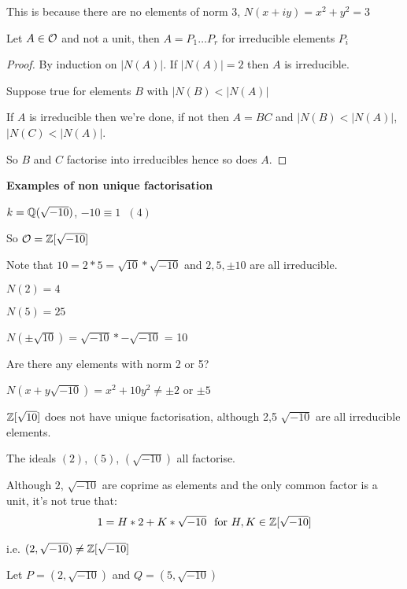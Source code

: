 \documentclass[11pt]{article}
\begin{document}
This is because there are no elements of norm $3$, $N(x+iy) = x^2+ y^2 = 3$ \lightning



\begin{prop}
Let $A \in \mathcal{O}$ and not a unit, then $A= P_1\dots P_r$ for irreducible elements $P_i$ 
\end{prop}
\begin{proof}
	By induction on $|N(A)|$. If $|N(A)| = 2$ then $A$ is irreducible.
	\spa

	Suppose true for elements $B$ with $|N(B)<|N(A)|$
	\spa

	If $A$ is irreducible then we're done, if not then $A=BC$ and $|N(B)<|N(A)|$, $|N(C)<|N(A)|$.

	So $B$ and $C$ factorise into irreducibles hence so does $A$.
\end{proof}
\spa
\textbf{Examples of non unique factorisation}

$k = \mathbb{Q}(\sqrt{-10})$, \hspace{7pt} $-10 \equiv 1 \hspace{7pt} (4) $
\spa

So $\mathcal{O} = \mathbb{Z}[\sqrt{-10}] $
\spa

Note that $10 = 2*5 = \sqrt{10} * \sqrt{-10}$ and $2, 5, \pm 10$ are all irreducible.
\spa

$N(2) = 4$

$N(5) = 25$

$N(\pm \sqrt{10} ) = \sqrt{-10}*-\sqrt{-10}$ = 10
\spa

Are there any elements with norm 2 or 5?
\spa

$N(x+y\sqrt{-10}) = x^2 + 10y^2 \neq \pm 2$ or $\pm 5$
\spa

$\mathbb{Z}[\sqrt{10}]$ does not have unique factorisation, although 2,5 $\sqrt{-10}$ are all irreducible elements. 

The ideals $(2)$, $(5)$, $(\sqrt{-10})$ all factorise.
\spa

Although $2$, $\sqrt{-10}$ are coprime as elements and the only common factor is a unit, it's not true that:
\begin{align*}
	1 = H*2 + K*\sqrt{-10} \hspace{7pt} \text{for } H,K \in \mathbb{Z}[\sqrt{-10}]
\end{align*}

i.e. $(2, \sqrt{-10}) \neq \mathbb{Z}[\sqrt{-10}]$
\spa

Let $ P= (2, \sqrt{-10})$ and $Q = (5, \sqrt{-10})$ 
\end{document}
